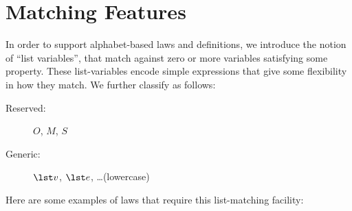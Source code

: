 \chapter{Matching Features}\label{chp:match-feat}

In order to support alphabet-based laws and definitions,
we introduce the notion of ``list variables'',
that match against zero or more variables satisfying some property.
These list-variables encode simple expressions that give
some flexibility in how they match.
We further classify as follows:
\begin{description}
  \item[Reserved:]  $O$, $M$, $S$
  \item[Generic:] $\lst v$, $\lst e$, \ldots (lowercase)
\end{description}
Here are some examples of laws that require this list-matching facility:
